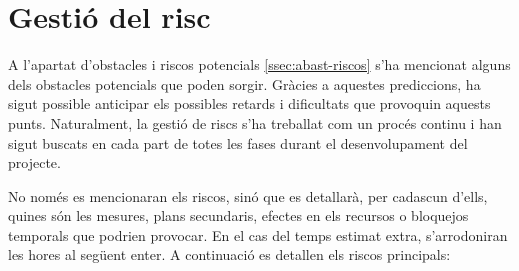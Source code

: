 \section{Gestió del risc} \label{sec:gestio_risc}
A l'apartat d'obstacles i riscos potencials \ref{ssec:abast-riscos} s'ha mencionat alguns dels obstacles potencials que poden sorgir. Gràcies a aquestes prediccions, ha sigut possible anticipar els possibles retards i dificultats que provoquin aquests punts. Naturalment, la gestió de riscs s'ha treballat com un procés continu i han sigut buscats en cada part de totes les fases durant el desenvolupament del projecte.

No només es mencionaran els riscos, sinó que es detallarà, per cadascun d'ells, quines són les mesures, plans secundaris, efectes en els recursos o bloquejos temporals que podrien provocar. En el cas del temps estimat extra, s'arrodoniran les hores al següent enter. A continuació es detallen els riscos principals:


